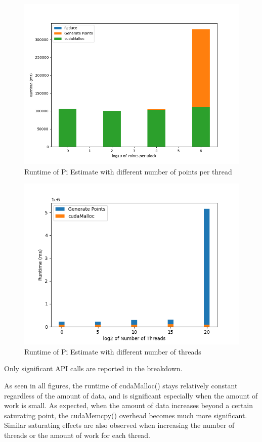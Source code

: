 \documentclass{article}
\begin{document}
\begin{figure}[h!]
	\centering
	\includegraphics[width=.8\linewidth]{p2-1.png}
	\caption{Runtime of Pi Estimate with different number of points per thread}
	\label{fig:p2-1}
\end{figure}
\begin{figure}[h!]
	\centering
	\includegraphics[width=.8\linewidth]{p2-2.png}
	\caption{Runtime of Pi Estimate with different number of threads}
	\label{fig:p2-2}
\end{figure}

Only significant API calls are reported in the breakdown.

As seen in all figures, the runtime of cudaMalloc() stays relatively constant regardless of the amount of data, and is significant especially when the amount of work is small. As expected, when the amount of data increases beyond a certain saturating point, the cudaMemcpy() overhead becomes much more significant. Similar saturating effects are also observed when increasing the number of threads or the amount of work for each thread.
\end{document}
